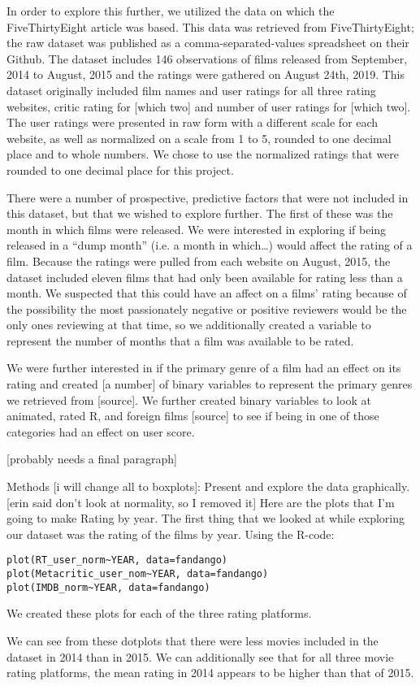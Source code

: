 \documentclass[letter,12pt]{article}
\begin{document}
	In order to explore this further, we utilized the data on which the FiveThirtyEight article was based. This data was retrieved from FiveThirtyEight; the raw dataset was published as a comma-separated-values spreadsheet on their Github. The dataset includes 146 observations of films released from September, 2014 to August, 2015 and the ratings were gathered on August 24th, 2019. This dataset originally included film names and user ratings for all three rating websites, critic rating for [which two] and number of user ratings for [which two]. The user ratings were presented in raw form with a different scale for each website, as well as normalized on a scale from 1 to 5, rounded to one decimal place and to whole numbers. We chose to use the normalized ratings that were rounded to one decimal place for this project. 

	There were a number of prospective, predictive factors that were not included in this dataset, but that we wished to explore further. The first of these was the month in which films were released. We were interested in exploring if being released in a “dump month” (i.e. a month in which…) would affect the rating of a film. Because the ratings were pulled from each website on August, 2015, the dataset included eleven films that had only been available for rating less than a month. We suspected that this could have an affect on a films’ rating because of the possibility the most passionately negative or positive reviewers would be the only ones reviewing at that time, so we additionally created a variable to represent the number of months that a film was available to be rated. 

	We were further interested in if the primary genre of a film had an effect on its rating and created [a number] of binary variables to represent the primary genres we retrieved from [source]. We further created binary variables to look at animated, rated R, and foreign films [source] to see if being in one of those categories had an effect on user score. 

	[probably needs a final paragraph]

	Methods [i will change all to boxplots]: 
	Present and explore the data graphically. 
	[erin said don’t look at normality, so I removed it] 
	Here are the plots that I’m going to make 
	Rating by year. 
	The first thing that we looked at while exploring our dataset was the rating of the films by year. Using the R-code:
\begin{verbatim}
plot(RT_user_norm~YEAR, data=fandango)
plot(Metacritic_user_nom~YEAR, data=fandango)
plot(IMDB_norm~YEAR, data=fandango)
\end{verbatim}
	We created these plots for each of the three rating platforms.
	\begin{center}
	\end{center}
	We can see from these dotplots that there were less movies included in the dataset in 2014 than in 2015.  We can additionally see that for all three movie rating platforms, the mean rating in 2014 appears to be higher than that of 2015. 
\end{document}
